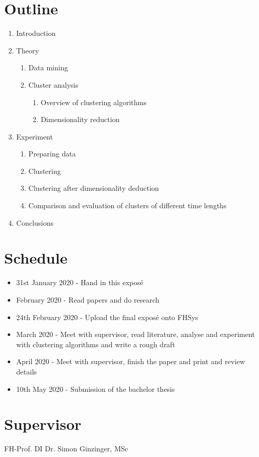 \documentclass[12pt,a4paper]{article}
\begin{document}
\section*{Outline}

\begin{enumerate}
	\item Introduction
	\item Theory
	\begin{enumerate}
		\item Data mining 
		\item Cluster analysis
		\begin{enumerate}
			\item Overview of clustering algorithms
			\item Dimensionality reduction
		\end{enumerate}
	\end{enumerate}
	\item Experiment
	\begin{enumerate}
		\item Preparing data
		\item Clustering
		\item Clustering after dimensionality deduction
		\item Comparison and evaluation of clusters of different time lengths
	\end{enumerate}
	\item Conclusions
\end{enumerate}

\nocite{*}
\printbibliography

\section*{Schedule}

\begin{itemize}
	\item 31st January 2020 - Hand in this exposé
	\item February 2020 - Read papers and do research
	\item 24th February 2020 - Upload the final exposé onto FHSys
	\item March 2020 - Meet with supervisor, read literature, analyse and experiment with clustering algorithms and write a rough draft
	\item April 2020 - Meet with supervisor, finish the paper and print and review details
	\item 10th May 2020 - Submission of the bachelor thesis
\end{itemize}

\section*{Supervisor}

FH-Prof. DI Dr. Simon Ginzinger, MSc
\end{document}
